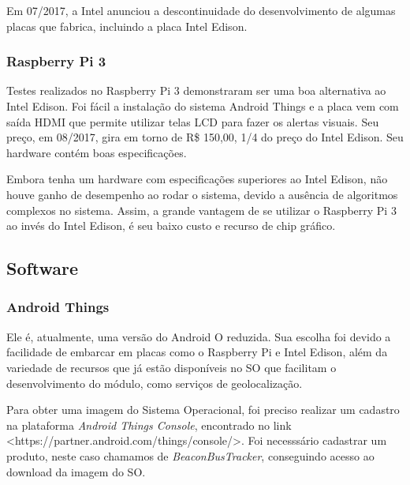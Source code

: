 \documentclass[
	12pt,				%
	oneside,			%
	a4paper,			%
	brazil				%
]{abntex2}
\begin{document}
Em 07/2017, a Intel anunciou a descontinuidade do desenvolvimento de algumas placas que fabrica, incluindo a placa Intel Edison.

\subsubsection{Raspberry Pi 3}

Testes realizados no Raspberry Pi 3 demonstraram ser uma boa alternativa ao Intel Edison. Foi fácil a instalação do sistema Android Things e a placa vem com saída HDMI que permite utilizar telas LCD para fazer os alertas visuais.
Seu preço, em 08/2017, gira em torno de R\$ 150,00, 1/4 do preço do Intel Edison. Seu hardware contém boas especificações.

Embora tenha um hardware com especificações superiores ao Intel Edison, não houve ganho de desempenho ao rodar o sistema, devido a ausência de algoritmos complexos no sistema. Assim, a grande vantagem de se utilizar o Raspberry Pi 3 ao invés do Intel Edison, é seu baixo custo e recurso de chip gráfico.

\subsection{Software}

\subsubsection{Android Things}

Ele é, atualmente, uma versão do Android O reduzida. Sua escolha foi devido a facilidade de embarcar em placas como o Raspberry Pi e Intel Edison, além da variedade de recursos que já estão disponíveis no SO que facilitam o desenvolvimento do módulo, como serviços de geolocalização. 

Para obter uma imagem do Sistema Operacional, foi preciso realizar um cadastro na plataforma \textit{Android Things Console}, encontrado no link <https://partner.android.com/things/console/>. Foi necesssário cadastrar um produto, neste caso chamamos de \textit{BeaconBusTracker}, conseguindo acesso ao download da imagem do SO.
\end{document}
